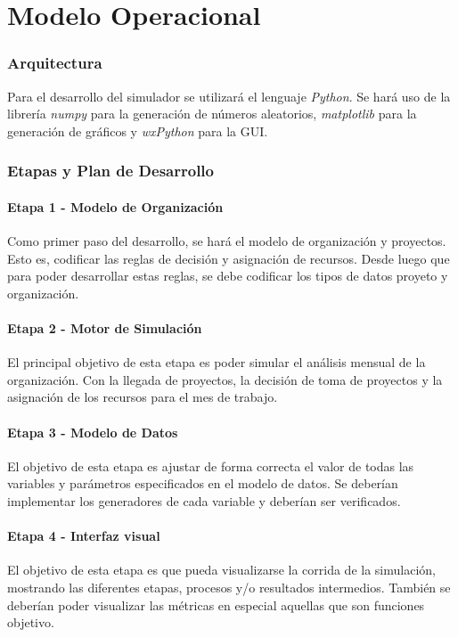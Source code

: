 \part*{Modelo Operacional}

\section{Arquitectura}

Para el desarrollo del simulador se utilizará el lenguaje \textit{Python}. Se hará uso de la librería \textit{numpy} para la generación de números aleatorios, \textit{matplotlib}
para la generación de gráficos y \textit{wxPython} para la GUI.\\

\section{Etapas y Plan de Desarrollo}

\subsection*{Etapa 1 - Modelo de Organización}
Como primer paso del desarrollo, se hará el modelo de organización y proyectos. Esto es, codificar las reglas de decisión y asignación de recursos. Desde luego que para poder 
desarrollar estas reglas, se debe codificar los tipos de datos proyeto y organización.\\

\subsection*{Etapa 2 - Motor de Simulación}
El principal objetivo de esta etapa es poder simular el análisis mensual de la organización. Con la llegada de proyectos, la decisión de toma de proyectos y la asignación de los 
recursos para el mes de trabajo.\\

\subsection*{Etapa 3 - Modelo de Datos}
El objetivo de esta etapa es ajustar de forma correcta el valor de todas las variables y parámetros especificados en el modelo de datos. Se deberían implementar los 
generadores de cada variable y deberían ser verificados.\\

\subsection*{Etapa 4 - Interfaz visual}
El objetivo de esta etapa es que pueda visualizarse la corrida de la simulación, mostrando las diferentes etapas, procesos y/o resultados intermedios. También se deberían
poder visualizar las métricas en especial aquellas que son funciones objetivo.\\


